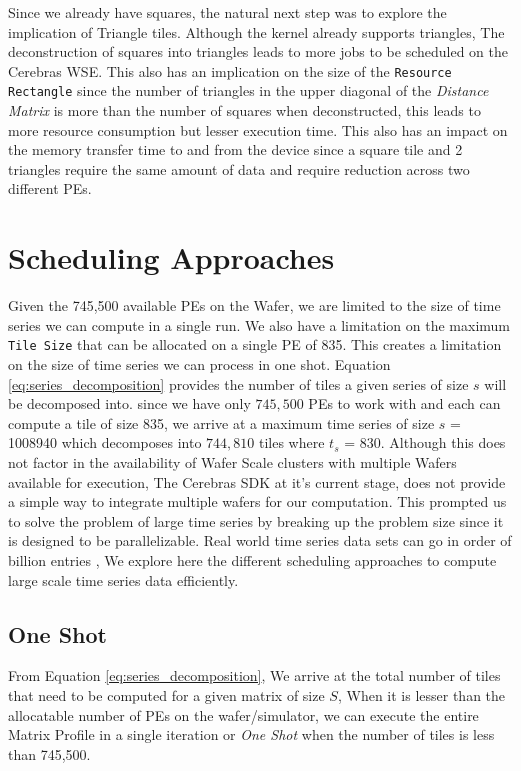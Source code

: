 Since we already have squares, the natural next step was to explore the implication of Triangle tiles. Although the kernel already supports triangles, The deconstruction of squares into triangles leads to more jobs to be scheduled on the Cerebras WSE. This also has an implication on the size of the \texttt{Resource Rectangle} since the number of triangles in the upper diagonal of the \textit{Distance Matrix} is more than the number of squares when deconstructed, this leads to more resource consumption but lesser execution time. This also has an impact on the memory transfer time to and from the device since a square tile and 2 triangles require the same amount of data and require reduction across two different PEs.

\section{Scheduling Approaches} \label{section:scheduling}

Given the 745,500 available PEs on the Wafer, we are limited to the size of time series we can compute in a single run. We also have a limitation on the maximum \texttt{Tile Size} that can be allocated on a single PE of 835. This creates a limitation on the size of time series we can process in one shot. Equation \ref{eq:series_decomposition} provides the number of tiles a given series of size $s$ will be decomposed into. since we have only $745,500$ PEs to work with and each can compute a tile of size 835, we arrive at a maximum time series of size $s$ = 1008940 which decomposes into $744,810$ tiles where $t_s$ = 830. Although this does not factor in the availability of Wafer Scale clusters with multiple Wafers available for execution, The Cerebras SDK at it's current stage, does not provide a simple way to integrate multiple wafers for our computation. This prompted us to solve the problem of large time series by breaking up the problem size since it is designed to be parallelizable. Real world time series data sets can go in order of billion entries \cite{8}, We explore here the different scheduling approaches to compute large scale time series data efficiently. 

\subsection{One Shot} \label{section:one-shot}

From Equation \ref{eq:series_decomposition}, We arrive at the total number of tiles that need to be computed for a given matrix of size $S$, When it is lesser than the allocatable number of PEs on the wafer/simulator, we can execute the entire Matrix Profile in a single iteration or \textit{One Shot} when the number of tiles is less than 745,500.

